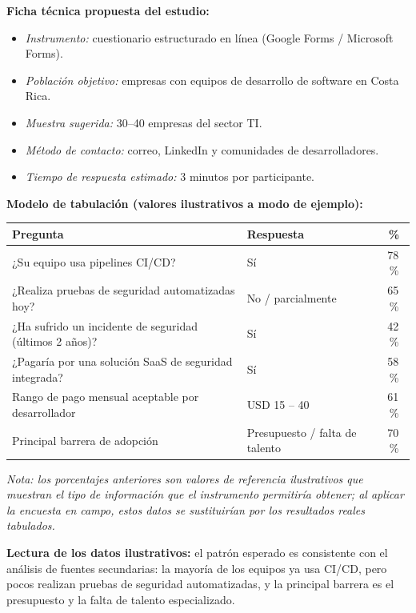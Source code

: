 \noindent\textbf{Ficha técnica propuesta del estudio:}
\begin{itemize}
  \item \emph{Instrumento:} cuestionario estructurado en línea (Google Forms / Microsoft Forms).
  \item \emph{Población objetivo:} empresas con equipos de desarrollo de software en Costa Rica.
  \item \emph{Muestra sugerida:} 30--40 empresas del sector TI.
  \item \emph{Método de contacto:} correo, LinkedIn y comunidades de desarrolladores.
  \item \emph{Tiempo de respuesta estimado:} 3 minutos por participante.
\end{itemize}

\noindent\textbf{Modelo de tabulación (valores ilustrativos a modo de ejemplo):}

\begin{table}[ht]
  \centering
  \begin{tabularx}{\linewidth}{Y Y c}
    \toprule
    \textbf{Pregunta} & \textbf{Respuesta} & \textbf{\%} \\
    \midrule
    ¿Su equipo usa pipelines CI/CD?                       & Sí                        & 78\,\% \\
    ¿Realiza pruebas de seguridad automatizadas hoy?      & No / parcialmente         & 65\,\% \\
    ¿Ha sufrido un incidente de seguridad (últimos 2 años)? & Sí                      & 42\,\% \\
    ¿Pagaría por una solución SaaS de seguridad integrada? & Sí                       & 58\,\% \\
    Rango de pago mensual aceptable por desarrollador     & USD 15 -- 40              & 61\,\% \\
    Principal barrera de adopción                         & Presupuesto / falta de talento & 70\,\% \\
    \bottomrule
  \end{tabularx}
\end{table}

\emph{Nota: los porcentajes anteriores son valores de referencia ilustrativos que
muestran el tipo de información que el instrumento permitiría obtener; al aplicar la
encuesta en campo, estos datos se sustituirían por los resultados reales tabulados.}

\noindent\textbf{Lectura de los datos ilustrativos:} el patrón esperado es consistente
con el análisis de fuentes secundarias: la mayoría de los equipos ya usa CI/CD, pero
pocos realizan pruebas de seguridad automatizadas, y la principal barrera es el
presupuesto y la falta de talento especializado.

